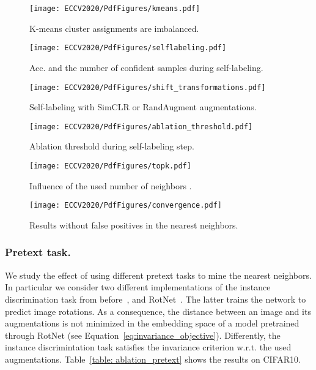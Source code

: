 \documentclass[runningheads]{llncs}
\begin{document}
\begin{figure}[t]
\begin{minipage}[t]{.31\linewidth} \centering
\texttt{[image: ECCV2020/PdfFigures/kmeans.pdf]}
\caption{K-means cluster assignments are imbalanced.}
\label{fig: kmeans}
\end{minipage} \hspace{0.02\linewidth}
\begin{minipage}[t]{.31\linewidth} \centering
\texttt{[image: ECCV2020/PdfFigures/selflabeling.pdf]}
\caption{Acc. and the number of confident samples during self-labeling.}
\label{fig: self_labeling}
\end{minipage} \hspace{0.02\linewidth}
\begin{minipage}[t]{.31\linewidth} \centering
\texttt{[image: ECCV2020/PdfFigures/shift\_transformations.pdf]}
\caption{Self-labeling with SimCLR or RandAugment augmentations.}
\label{fig: shift_augs}
\end{minipage} \end{figure}
\begin{figure}[t]
\begin{minipage}[t]{.31\linewidth} \centering
\texttt{[image: ECCV2020/PdfFigures/ablation\_threshold.pdf]}
\caption{Ablation threshold during self-labeling step.}
\label{fig: ablation_threshold}
\end{minipage} \hspace{0.02\linewidth}
\begin{minipage}[t]{.31\linewidth} \centering
\texttt{[image: ECCV2020/PdfFigures/topk.pdf]}
\caption{Influence of the used number of neighbors .}
\label{fig: topk}
\end{minipage} \hspace{0.02\linewidth}
\begin{minipage}[t]{.31\linewidth} \centering
\texttt{[image: ECCV2020/PdfFigures/convergence.pdf]}
\caption{Results without false positives in the nearest neighbors.}
\label{fig: convergence}
\end{minipage} \end{figure}


\subsubsection{Pretext task.}
We study the effect of using different pretext tasks to mine the nearest neighbors. In particular we consider two different implementations of the instance discrimination task from before~\cite{wu2018unsupervised,chen2020simple}, and RotNet~\cite{RotNet}. The latter trains the network to predict image rotations. As a consequence, the distance between an image  and its augmentations  is not minimized in the embedding space of a model pretrained through RotNet (see Equation~\ref{eq:invariance_objective}). Differently, the instance discrimintation task satisfies the invariance criterion w.r.t. the used augmentations. Table~\ref{table: ablation_pretext} shows the results on CIFAR10. 
\end{document}
